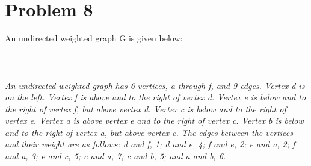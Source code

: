 \documentclass{amsart}
\theoremstyle{definition}
\theoremstyle{Exercise}
\theoremstyle{remark}
\theoremstyle{rule}
\numberwithin{equation}{section}
\begin{document}
\section*{Problem 8}
An undirected weighted graph G is given below:\\\\
\\\\
{\color{blue}{\bf Figure 16:} \emph{An undirected weighted graph has 6 vertices, a through f, and 9 edges. Vertex d is on the left. Vertex f is above and to the right of vertex d. Vertex e is below and to the right of vertex f, but above vertex d. Vertex c is below and to the right of vertex e. Vertex a is above vertex e and to the right of vertex c. Vertex b is below and to the right of vertex a, but above vertex c. The edges between the vertices and their weight are as follows: d and f, 1; d and e, 4; f and e, 2; e and a, 2; f and a, 3; e and c, 5; c and a, 7; c and b, 5; and a and b, 6.
\\
}
}
\\
\\
\end{document}
